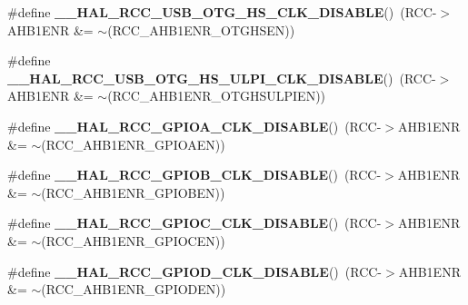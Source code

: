 \begin{DoxyCompactItemize}
\#define {\bfseries \+\_\+\+\_\+\+H\+A\+L\+\_\+\+R\+C\+C\+\_\+\+U\+S\+B\+\_\+\+O\+T\+G\+\_\+\+H\+S\+\_\+\+C\+L\+K\+\_\+\+D\+I\+S\+A\+B\+LE}()~(R\+CC-\/$>$A\+H\+B1\+E\+NR \&= $\sim$(R\+C\+C\+\_\+\+A\+H\+B1\+E\+N\+R\+\_\+\+O\+T\+G\+H\+S\+EN))
\item 
\mbox{\label{group___r_c_c_ex___peripheral___clock___enable___disable_ga0dab1b49a8c36801028f0d7dccd9aedd}} 
\#define {\bfseries \+\_\+\+\_\+\+H\+A\+L\+\_\+\+R\+C\+C\+\_\+\+U\+S\+B\+\_\+\+O\+T\+G\+\_\+\+H\+S\+\_\+\+U\+L\+P\+I\+\_\+\+C\+L\+K\+\_\+\+D\+I\+S\+A\+B\+LE}()~(R\+CC-\/$>$A\+H\+B1\+E\+NR \&= $\sim$(R\+C\+C\+\_\+\+A\+H\+B1\+E\+N\+R\+\_\+\+O\+T\+G\+H\+S\+U\+L\+P\+I\+EN))
\item 
\mbox{\label{group___r_c_c_ex___peripheral___clock___enable___disable_ga7083e491e6a1e165d064d199304bd2f0}} 
\#define {\bfseries \+\_\+\+\_\+\+H\+A\+L\+\_\+\+R\+C\+C\+\_\+\+G\+P\+I\+O\+A\+\_\+\+C\+L\+K\+\_\+\+D\+I\+S\+A\+B\+LE}()~(R\+CC-\/$>$A\+H\+B1\+E\+NR \&= $\sim$(R\+C\+C\+\_\+\+A\+H\+B1\+E\+N\+R\+\_\+\+G\+P\+I\+O\+A\+EN))
\item 
\mbox{\label{group___r_c_c_ex___peripheral___clock___enable___disable_ga60be1be419b57dafbbb93df67d68a424}} 
\#define {\bfseries \+\_\+\+\_\+\+H\+A\+L\+\_\+\+R\+C\+C\+\_\+\+G\+P\+I\+O\+B\+\_\+\+C\+L\+K\+\_\+\+D\+I\+S\+A\+B\+LE}()~(R\+CC-\/$>$A\+H\+B1\+E\+NR \&= $\sim$(R\+C\+C\+\_\+\+A\+H\+B1\+E\+N\+R\+\_\+\+G\+P\+I\+O\+B\+EN))
\item 
\mbox{\label{group___r_c_c_ex___peripheral___clock___enable___disable_ga0fc90c25d35f9b5b5f66961505de1cd4}} 
\#define {\bfseries \+\_\+\+\_\+\+H\+A\+L\+\_\+\+R\+C\+C\+\_\+\+G\+P\+I\+O\+C\+\_\+\+C\+L\+K\+\_\+\+D\+I\+S\+A\+B\+LE}()~(R\+CC-\/$>$A\+H\+B1\+E\+NR \&= $\sim$(R\+C\+C\+\_\+\+A\+H\+B1\+E\+N\+R\+\_\+\+G\+P\+I\+O\+C\+EN))
\item 
\mbox{\label{group___r_c_c_ex___peripheral___clock___enable___disable_gaeaefe364dafdc0c22353969595421422}} 
\#define {\bfseries \+\_\+\+\_\+\+H\+A\+L\+\_\+\+R\+C\+C\+\_\+\+G\+P\+I\+O\+D\+\_\+\+C\+L\+K\+\_\+\+D\+I\+S\+A\+B\+LE}()~(R\+CC-\/$>$A\+H\+B1\+E\+NR \&= $\sim$(R\+C\+C\+\_\+\+A\+H\+B1\+E\+N\+R\+\_\+\+G\+P\+I\+O\+D\+EN))

\end{DoxyCompactItemize}
